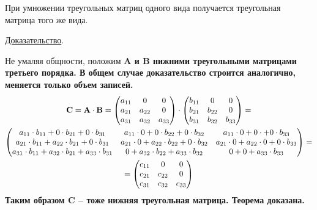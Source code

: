 \begin{theorem}
    При умножении треугольных матриц одного вида получается треугольная матрица того же вида.

    \underline{Доказательство}.
    \vspace{5pt}

    Не умаляя общности, положим \bf{A} и \bf{B} нижними треугольными матрицами третьего порядка. В общем случае
    доказательство строится аналогично, меняется только объем записей.
    \begin{gather*}
        \bf{C} = \bf{A} \cdot \bf{B} =
        \begin{pmatrix}
            a_{11} & 0      & 0      \\
            a_{21} & a_{22} & 0      \\
            a_{31} & a_{32} & a_{33}
        \end{pmatrix} \cdot
        \begin{pmatrix}
            b_{11} & 0      & 0      \\
            b_{21} & b_{22} & 0      \\
            b_{31} & b_{32} & b_{33}
        \end{pmatrix} = \\
        \begin{pmatrix}
            a_{11} \cdot b_{11} + 0 \cdot b_{21} + 0 \cdot b_{31}           & a_{11} \cdot 0 + 0 \cdot b_{22} + 0 \cdot b_{32} & a_{11} \cdot 0 + 0 \cdot + 0 \cdot b_{33} \\
            a_{21} \cdot b_{11} + a_{22} \cdot b_{21} + 0 \cdot b_{31}      & a_{21} \cdot 0 + a_{22} \cdot b_{22} + 0 \cdot b_{32} & a_{21} \cdot 0 + a_{22} \cdot 0 + 0 \cdot b_{33} \\
            a_{31} \cdot b_{11} + a_{32} \cdot b_{21} + a_{33} \cdot b_{31} & 0 + a_{32} \cdot b_{22} + a_{33} \cdot b_{32} & 0 + 0 + a_{33} \cdot b_{33}
        \end{pmatrix} = \\
        = \begin{pmatrix}
              c_{11} & 0      & 0      \\
              c_{21} & c_{22} & 0      \\
              c_{31} & c_{32} & c_{33}
        \end{pmatrix}
    \end{gather*}
    Таким образом \bf{C} -- тоже нижняя треугольная матрица. Теорема доказана.
\end{theorem}

